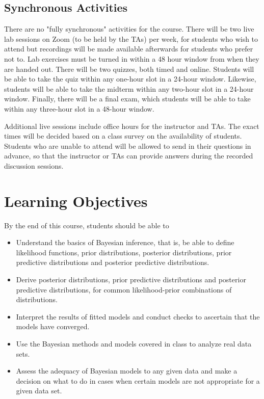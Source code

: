 \documentclass[11pt, a4paper]{article}
\begin{document}
\subsection{Synchronous Activities}
There are no "fully synchronous" activities for the course. There will be two live lab sessions on Zoom (to be held by the TAs) per week, for students who wish to attend but recordings will be made available afterwards for students who prefer not to. Lab exercises must be turned in within a 48 hour window from when they are handed out. There will be two quizzes, both timed and online. Students will be able to take the quiz within any one-hour slot in a 24-hour window. Likewise, students will be able to take the midterm within any two-hour slot in a 24-hour window.  Finally, there will be a final exam, which students will be able to take within any three-hour slot in a 48-hour window. 

Additional live sessions include office hours for the instructor and TAs. The exact times will be decided based on a class survey on the availability of students. Students who are unable to attend will be allowed to send in their questions in advance, so that the instructor or TAs can provide answers during the recorded discussion sessions.

\section{Learning Objectives}
By the end of this course, students should be able to
\begin{itemize}[label= {\color{darkblue}{\ArrowBoldRightStrobe}}]
	\item Understand the basics of Bayesian inference, that is, be able to define likelihood functions, prior distributions, posterior distributions, prior predictive distributions and posterior predictive distributions.
	\item Derive posterior distributions, prior predictive distributions and posterior predictive distributions, for common likelihood-prior combinations of distributions.
	\item Interpret the results of fitted models and conduct checks to ascertain that the models have converged.
	\item Use the Bayesian methods and models covered in class to analyze real data sets.
	\item Assess the adequacy of Bayesian models to any given data and make a decision on what to do in cases when certain models are not appropriate for a given data set.
\end{itemize}
\end{document}
